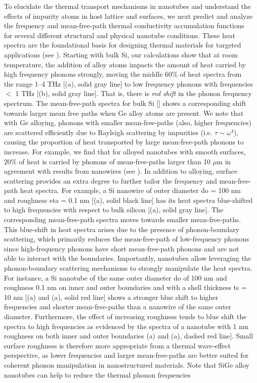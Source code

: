 To elucidate the thermal transport mechanisms in nanotubes and understand the effects of impurity atoms in host lattice and surfaces, we next predict and analyze the frequency and mean-free-path thermal conductivity accumulation functions for several different structural and physical nanotube conditions. These heat spectra are the foundational basis for designing thermal materials for targeted applications (see ). Starting with bulk Si, our calculations show that at room temperature, the addition of alloy atoms impacts the amount of heat carried by high frequency phonons strongly, moving the middle 60\% of heat spectra from the range 1–4 THz [(a), solid gray line] to low frequency phonons with frequencies $<$ 1 THz [(b), solid gray line]. That is, there is \emph{red shift} in the phonon frequency spectrum. The mean-free-path spectra for bulk Si [] shows a corresponding shift towards larger mean free paths when Ge alloy atoms are present. We note that with Ge alloying, phonons with smaller mean-free-paths (also, higher frequencies) 	are scattered efficiently due to Rayleigh scattering by impurities (i.e. $\tau\!\sim\!\omega^{4}$), causing the proportion of heat transported by large mean-free-path phonons to increase. For example, we find that for alloyed nanotubes with smooth surfaces, 20\% of heat is carried by phonons of mean-free-paths larger than 10 $\mu$m in agreement with results from nanowires (see ). In addition to alloying, surface scattering provides an extra degree to further tailor the frequency and mean-free-path heat spectra. For example, a Si nanowire of outer diameter \gls{do} = 100 nm and roughness \gls{eta} = 0.1 nm [(a), solid black line] has its heat spectra blue-shifted to high frequencies with respect to bulk silicon [(a), solid gray line]. The corresponding mean-free-path spectra moves towards smaller mean-free-paths. This blue-shift in heat spectra arises due to the presence of phonon-boundary scattering, which primarily reduces the mean-free-path of low-frequency phonons since high-frequency phonons have short mean-free-path phonons and are not able to interact with the boundaries. Importantly, nanotubes allow leveraging the phonon-boundary scattering mechanisms to strongly manipulate the heat spectra. For instance, a Si nanotube of the same outer diameter \gls{do} of 100 nm and roughness 0.1 nm on inner and outer boundaries and with a shell thickness \gls{ts} = 10 nm [(a) and (a), solid red line] shows a stronger blue shift to higher frequencies and shorter mean-free-paths than a nanowire of the same outer diameter. Furthermore, the effect of increasing roughness tends to blue shift the spectra to high frequencies as evidenced by the spectra of a nanotube with 1 nm roughness on both inner and outer boundaries (a) and (a), dashed red line]. Small surface roughness is therefore more appropriate from a thermal wave-effect perspective, as lower frequencies and larger mean-free-paths are better suited for coherent phonon manipulation in nanostructured materials. Note that SiGe alloy nanotubes can help to reduce the thermal phonon frequencies 
